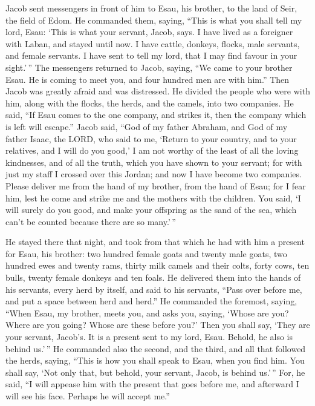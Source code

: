  Jacob sent messengers in front of him to Esau, his
brother, to the land of Seir, the field of Edom.  He
commanded them, saying, ``This is what you shall tell my lord, Esau:
`This is what your servant, Jacob, says. I have lived as a foreigner
with Laban, and stayed until now.  I have cattle, donkeys,
flocks, male servants, and female servants. I have sent to tell my lord,
that I may find favour in your sight.'\,''  The messengers
returned to Jacob, saying, ``We came to your brother Esau. He is coming
to meet you, and four hundred men are with him.''  Then
Jacob was greatly afraid and was distressed. He divided the people who
were with him, along with the flocks, the herds, and the camels, into
two companies.  He said, ``If Esau comes to the one
company, and strikes it, then the company which is left will escape.''
 Jacob said, ``God of my father Abraham, and God of my
father Isaac, the LORD, who said to me, `Return to your country, and to
your relatives, and I will do you good,'  I am not worthy
of the least of all the loving kindnesses, and of all the truth, which
you have shown to your servant; for with just my staff I crossed over
this Jordan; and now I have become two companies.  Please
deliver me from the hand of my brother, from the hand of Esau; for I
fear him, lest he come and strike me and the mothers with the children.
 You said, `I will surely do you good, and make your
offspring as the sand of the sea, which can't be counted because there
are so many.'\,''

 He stayed there that night, and took from that which he
had with him a present for Esau, his brother:  two
hundred female goats and twenty male goats, two hundred ewes and twenty
rams,  thirty milk camels and their colts, forty cows,
ten bulls, twenty female donkeys and ten foals.  He
delivered them into the hands of his servants, every herd by itself, and
said to his servants, ``Pass over before me, and put a space between
herd and herd.''  He commanded the foremost, saying,
``When Esau, my brother, meets you, and asks you, saying, `Whose are
you? Where are you going? Whose are these before you?' 
Then you shall say, `They are your servant, Jacob's. It is a present
sent to my lord, Esau. Behold, he also is behind us.'\,''
 He commanded also the second, and the third, and all
that followed the herds, saying, ``This is how you shall speak to Esau,
when you find him.  You shall say, `Not only that, but
behold, your servant, Jacob, is behind us.'\,'' For, he said, ``I will
appease him with the present that goes before me, and afterward I will
see his face. Perhaps he will accept me.''

